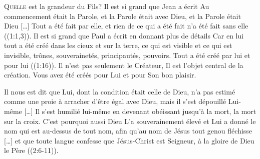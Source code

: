 


\lettrine{Q}{uelle} est la grandeur du Fils?
 Il est si grand que Jean a écrit\frcolon{} 
 \Og Au commencement était la Parole, et la Parole était avec Dieu,
 et la Parole était Dieu [\dots{}] Tout a été fait par elle,
 et rien de ce qui a été fait n'a été fait sans elle \Fg{}
 ((1:1,3)). Il est si grand que Paul a écrit en donnant
 plus de détails\frcolon{} 
 \Og Car en lui tout a été créé dans les cieux et sur la terre,
 ce qui est visible et ce qui est invisible, trônes, souverainetés,
 principautés, pouvoirs. Tout a été créé par lui et pour lui \Fg{}
 ((1:16)). Il n'est pas seulement le Créateur,
 Il est l'objet central de la création.
 Vous avez été créés pour Lui et pour Son bon plaisir.

Il nous est dit que \Og Lui, dont la condition était celle de Dieu,
 n'a pas estimé comme une proie à arracher d'être égal avec Dieu,
 mais il s'est dépouillé Lui-même [\dots{}] Il s'est humilié lui-même
 en devenant obéissant jusqu'à la mort, la mort sur la croix.
 C'est pourquoi aussi Dieu L'a souverainement élevé et Lui a donné le nom
 qui est au-dessus de tout nom, afin qu'au nom de Jésus tout genou
 fléchisse [\dots{}] et que toute langue confesse que Jésus-Christ
 est Seigneur, à la gloire de Dieu le Père \Fg{} ((2:6-11)).


\dvrule






